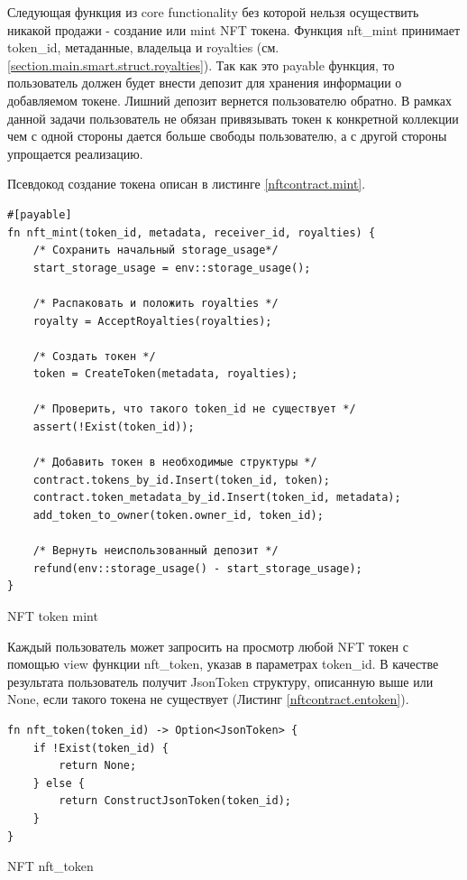 Следующая функция из core functionality без которой нельзя осуществить никакой продажи - создание или mint NFT токена. Функция nft\_mint принимает token\_id, метаданные, владельца и royalties (см. {\color{blue}\ref{section.main.smart.struct.royalties}}).
Так как это payable функция, то пользователь должен будет внести депозит для хранения информации о добавляемом токене. Лишний депозит вернется пользователю обратно.
В рамках данной задачи пользователь не обязан привязывать токен к конкретной коллекции чем с одной стороны дается больше свободы пользователю, а с другой стороны упрощается реализацию.

Псевдокод создание токена описан в листинге {\color{blue}\ref{nftcontract.mint}}.

\begin{listing}
\begin{verbatim}
#[payable]
fn nft_mint(token_id, metadata, receiver_id, royalties) {
    /* Сохранить начальный storage_usage*/
    start_storage_usage = env::storage_usage();

    /* Распаковать и положить royalties */
    royalty = AcceptRoyalties(royalties);

    /* Создать токен */
    token = CreateToken(metadata, royalties);

    /* Проверить, что такого token_id не существует */
    assert(!Exist(token_id));

    /* Добавить токен в необходимые структуры */
    contract.tokens_by_id.Insert(token_id, token);
    contract.token_metadata_by_id.Insert(token_id, metadata);
    add_token_to_owner(token.owner_id, token_id);

    /* Вернуть неиспользованный депозит */
    refund(env::storage_usage() - start_storage_usage);
}
\end{verbatim}
\caption{NFT token mint}
\label{nftcontract.mint}
\end{listing}

Каждый пользователь может запросить на просмотр любой NFT токен с помощью view функции nft\_token, указав в параметрах token\_id.
В качестве результата пользователь получит JsonToken структуру, описанную выше или None, если такого токена не существует (Листинг {\color{blue}\ref{nftcontract.entoken}}).

\begin{listing}
\begin{verbatim}
fn nft_token(token_id) -> Option<JsonToken> {
    if !Exist(token_id) {
        return None;
    } else {
        return ConstructJsonToken(token_id);
    }
}
\end{verbatim}
\caption{NFT nft\_token}
\label{nftcontract.entoken}
\end{listing}


